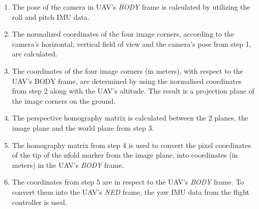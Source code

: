 \documentclass[conference]{IEEEtran}
\begin{document}
\begin{enumerate}

\item The pose of the camera in UAV's \emph{BODY} frame is calculated by utilizing the roll and pitch IMU data.


\item The normalized coordinates of the four image corners, according to the camera's horizontal, vertical field of view and the camera's pose from step 1, are calculated.


\item The coordinates of the four image corners (in meters), with respect to the UAV's BODY frame, are determined by using the normalised coordinates from step 2 along with the UAV's altitude. The result is a projection plane of the image corners on the ground.


\item The perspective homography matrix is calculated between the 2 planes, the image plane and the world plane from step 3.

\item The homography matrix from step 4 is used to convert the pixel coordinates of the tip of the nfold marker from the image plane, into  coordinates (in meters) in the UAV's \emph{BODY} frame.


\item The coordinates from step 5 are in respect to the UAV's \emph{BODY} frame. To convert them into the UAV's \emph{NED} frame, the yaw IMU data from the flight controller is used. 


\end{enumerate}
\end{document}
